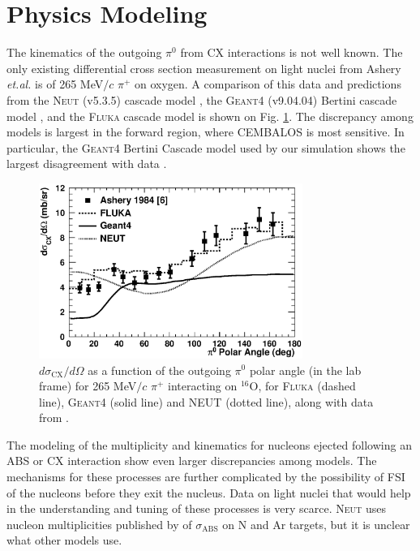 {\color{red}
\section{Physics Modeling}\label{sec:physics}
The kinematics of the outgoing $\pi^0$ from CX interactions is not well known. The only existing differential cross section measurement on light nuclei from Ashery \textit{et.al.} \cite{Ashery2} is of 265 MeV$/c$ $\pi^{+}$ on oxygen. A comparison of this data and predictions from the \textsc{Neut} (v5.3.5) cascade model \cite{NEUT}, the \textsc{Geant4} (v9.04.04) Bertini cascade model \cite{bertini}, and the \textsc{Fluka} cascade model \cite{fluka1,fluka2} is shown on Fig. \ref{fig:pi0kinem}. The discrepancy among models is largest in the forward region, where CEMBALOS is most sensitive. In particular, the \textsc{Geant4} Bertini Cascade model used by our simulation shows the largest disagreement with data \cite{Ashery2}.}

\begin{figure}[h]
 \includegraphics[width=86mm]{figures/dsigma_cx_o16_data_and_models.eps}
 \caption{$d\sigma_{\mathrm{CX}}/d\Omega$ as a function of the outgoing $\pi^0$ polar angle (in the lab frame) for 265 MeV$/c$ $\pi^{+}$ interacting on $^{16}$O, for \textsc{Fluka} (dashed line), \textsc{Geant4} (solid line) and \textsc{NEUT} (dotted line), along with data from \cite{Ashery2}.}
 \label{fig:pi0kinem}
\end{figure}
{\color{red}
The modeling of the multiplicity and kinematics for nucleons ejected following an ABS or CX interaction show even larger discrepancies among models. The mechanisms for these processes are further complicated by the possibility of FSI of the nucleons before they exit the nucleus. Data on light nuclei that would help in the understanding and tuning of these processes is very scarce. \textsc{Neut} uses nucleon multiplicities published by \cite{Rowntree} of $\sigma_{\mathrm{ABS}}$ on N and Ar targets, but it is unclear what other models use.
}